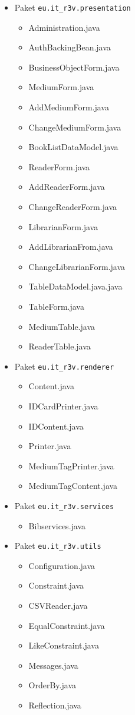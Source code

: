 \documentclass[fontsize=12pt,paper=a4,twoside]{scrartcl}
\begin{document}
\begin{itemize}
\item{Paket \texttt{eu.it\_r3v.presentation}}
\begin{itemize}
\item{Administration.java}
\item{AuthBackingBean.java}
\item{BusinessObjectForm.java}
\item{MediumForm.java}
\item{AddMediumForm.java}
\item{ChangeMediumForm.java}
\item{BookListDataModel.java}
\item{ReaderForm.java}
\item{AddReaderForm.java}
\item{ChangeReaderForm.java}
\item{LibrarianForm.java}
\item{AddLibrarianFrom.java}
\item{ChangeLibrarianForm.java}
\item{TableDataModel.java.java}
\item{TableForm.java}
\item{MediumTable.java}
\item{ReaderTable.java}
\end{itemize}

\item{Paket \texttt{eu.it\_r3v.renderer}}

\begin{itemize}
\item{Content.java}
\item{IDCardPrinter.java}
\item{IDContent.java}
\item{Printer.java}
\item{MediumTagPrinter.java}
\item{MediumTagContent.java}
\end{itemize}

\item{Paket \texttt{eu.it\_r3v.services}}

\begin{itemize}
\item{Bibservices.java}
\end{itemize}

\item{Paket \texttt{eu.it\_r3v.utils}}

\begin{itemize}
\item{Configuration.java}
\item{Constraint.java}
\item{CSVReader.java}
\item{EqualConstraint.java}
\item{LikeConstraint.java}
\item{Messages.java}
\item{OrderBy.java}
\item{Reflection.java}
\end{itemize}

\end{itemize}
\end{document}
